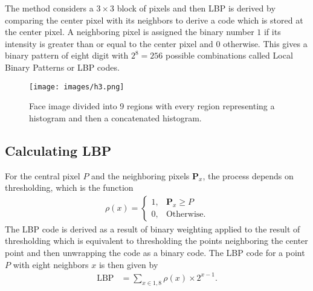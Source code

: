 The method considers a $3\times 3$ block of pixels and then LBP is derived by comparing the center pixel with its neighbors to derive a code which is stored at the center pixel. A neighboring pixel is assigned the binary number $1$ if its intensity is greater than or equal to the center pixel and $0$ otherwise. This gives a binary pattern of eight digit with $2^8 = 256$ possible combinations called Local Binary Patterns or LBP codes.


\begin{figure}[!h]
\centering 
\texttt{[image: images/h3.png]}
\caption{Face image divided into 9 regions with every region representing a histogram and then a concatenated histogram.}
\label{lbp1} 
\end{figure}

\subsection{Calculating LBP}
For the central pixel $P$ and the neighboring pixels $\mathbf{P}_x$, the process depends on thresholding, which is the function 
\begin{align}
\rho(x) =
\begin{cases}
1, & \mathbf{P}_x \geq P
\\
0, & \mathrm{Otherwise}.
\end{cases}
\end{align}
The LBP code is derived as a result of binary weighting applied to the result of thresholding which is equivalent to thresholding the points neighboring the center point and then unwrapping the code as a binary code. The LBP code for a point $P$ with
eight neighbors $x$ is then given by 
\begin{align} 
\mathrm{LBP} & = \sum_{x\in {1,8}}\rho (x)\times 2^{x-1}.\\
\end{align} 

